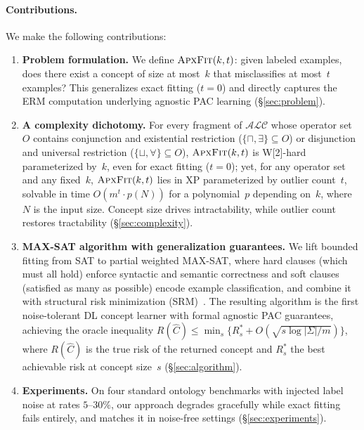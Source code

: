 \documentclass[accepted]{uai2026} %
\theoremstyle{definition}
\theoremstyle{remark}
\newcommand{\AF}{\textsc{ApxFit}}
\begin{document}
\paragraph{Contributions.} We make the following contributions:
\begin{enumerate}[leftmargin=*,itemsep=2pt,topsep=3pt]
  \item \textbf{Problem formulation.} We define
    $\AF(k,t)$: given labeled examples,
    does there exist a concept of size at most~$k$ that
    misclassifies at most~$t$ examples? This generalizes
    exact fitting ($t{=}0$) and directly captures the ERM
    computation underlying agnostic PAC learning
    (\S\ref{sec:problem}).

  \item \textbf{A complexity dichotomy.}
    For every fragment of
    $\mathcal{ALC}$ whose operator set~$O$ contains
    conjunction and existential restriction
    ($\{\sqcap, \exists\} \subseteq O$) or
    disjunction and universal restriction
    ($\{\sqcup, \forall\} \subseteq O$),    $\AF(k,t)$ is \textsf{W[2]-hard}
    parameterized by~$k$, even for exact fitting
    ($t{=}0$); yet, for any operator set and any fixed~$k$,
    $\AF(k,t)$ lies in XP parameterized    by outlier count~$t$, solvable in time
    $O(m^t \cdot p(N))$ for a polynomial~$p$ depending
    on~$k$, where $N$ is the input size. Concept size drives intractability, while outlier
    count restores tractability
    (\S\ref{sec:complexity}).

  \item \textbf{MAX-SAT algorithm with generalization guarantees.}
    We lift bounded fitting from SAT to partial weighted
    MAX-SAT, where hard clauses (which must all
    hold) enforce syntactic and semantic
    correctness and soft clauses (satisfied as many as possible)
    encode example classification, and
    combine it with structural risk
    minimization (SRM)~\citep{DBLP:conf/nips/Vapnik91}. The resulting
    algorithm is the first noise-tolerant DL concept learner with
    formal agnostic PAC guarantees, achieving the oracle inequality
    $R(\hat{C}) \leq \min_s \{R_s^* +
    O(\sqrt{s\log|\Sigma|/m})\}$, where
    $R(\hat{C})$ is the true risk of the returned concept
    and $R_s^*$ the best
    achievable risk at concept size~$s$
    (\S\ref{sec:algorithm}).

  \item \textbf{Experiments.} On four standard ontology benchmarks with injected
    label noise at rates $5$--$30\%$, our approach degrades
    gracefully while exact fitting fails entirely, and matches
    it in noise-free settings
    (\S\ref{sec:experiments}).
\end{enumerate}
\end{document}
